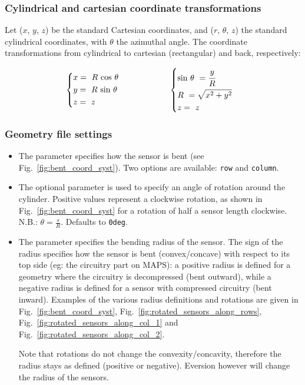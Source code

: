 \subsubsection{Cylindrical and cartesian coordinate transformations}
\label{sssec:cylindrical_coord_transformations}

Let ($x$, $y$, $z$) be the standard Cartesian coordinates, and ($r$, $\theta$, $z$) the standard cylindrical coordinates, with $\theta$ the azimuthal angle. The coordinate transformations from cylindrical to cartesian (rectangular) and back, respectively:

\begin{alignat*}{2}
  & \begin{dcases}
  x = \ R \ \text{cos $\theta$}\\
  y = \ R \ \text{sin $\theta$} \\
  z = \ z
  \end{dcases}
    & \hspace{5em} & \begin{dcases}
  \text{sin} \ \theta \ = \cfrac{y}{R}\\
  R \ = \sqrt{x^2+y^2} \\
  z = \ z
  \end{dcases}
\end{alignat*}



\subsubsection{Geometry file settings}
\label{sssec:cylindrical_coord_system_params}

\begin{itemize}
    \item The  parameter specifies how the sensor is bent (see Fig.~\ref{fig:bent_coord_syst}). Two options are available: \texttt{row} and \texttt{column}. 
    \item The optional  parameter is used to specify an angle of rotation around the cylinder. Positive values represent a clockwise rotation, as shown in Fig.~\ref{fig:bent_coord_syst} for a rotation of half a sensor length clockwise. N.B.: $\theta = \frac{s}{R}$. Defaults to \texttt{0deg}.
    \item The  parameter specifies the bending radius of the sensor. The sign of the radius specifies how the sensor is bent (convex/concave) with respect to its top side (eg: the circuitry part on MAPS): a positive radius is defined for a geometry where the circuitry is decompressed (bent outward), while a negative radius is defined for a sensor with compressed circuitry (bent inward). Examples of the various radius definitions and rotations are given in Fig.~\ref{fig:bent_coord_syst}, Fig.~\ref{fig:rotated_sensors_along_rows}, Fig.~\ref{fig:rotated_sensors_along_col_1} and Fig.~\ref{fig:rotated_sensors_along_col_2}. 
    
    Note that rotations do not change the convexity/concavity, therefore the radius stays as defined (positive or negative). Eversion however will change the radius of the sensors.
    \end{itemize}
    
